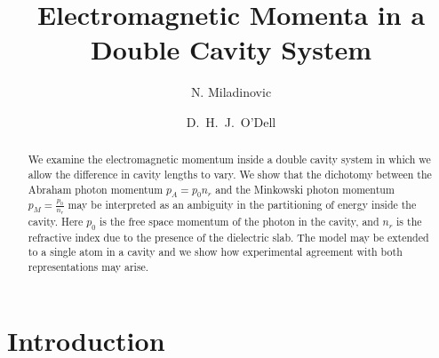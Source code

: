 \documentclass[twocolumn,english,pra,aps,superscriptaddress,floatfix]{revtex4-1}
\begin{document}
\author{N. Miladinovic}
\author{D.\ H.\ J.\ O'Dell}

\title{Electromagnetic Momenta in a Double Cavity System}

\begin{abstract}
\label{sec:abstract}
We examine the electromagnetic momentum inside a double cavity system in which we allow the difference in cavity lengths to vary.  We show that the dichotomy between the Abraham photon momentum $p_A= p_{0} n_{r}$ and the Minkowski photon momentum $p_M=\frac{p_{0}}{n_{r}}$ may be interpreted as an ambiguity in the partitioning of energy inside the cavity.  Here $p_0$ is the free space momentum of the photon in the cavity, and $n_{r}$ is the refractive index due to the presence of the dielectric slab. The model may be extended to a single atom in a cavity and we show how experimental agreement with both representations may arise. 
\end{abstract}


\maketitle

\section{Introduction}
\label{sec:intro}
\end{document}
